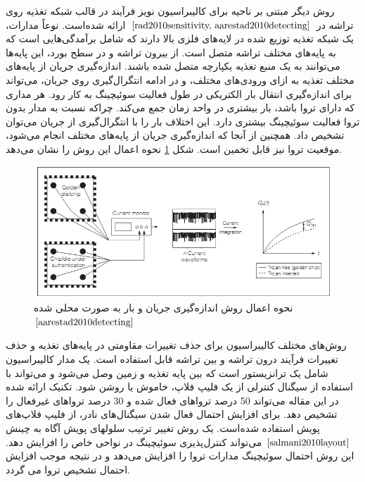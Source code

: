 روش دیگر مبتنی بر ناحیه برای کالیبراسیون نویز فرآیند در قالب شبکه تغذیه روی تراشه در 
$\cite{rad2010sensitivity, aarestad2010detecting}$
ارائه شده‌است. نوعاً مدارات، یک شبکه تغذیه توزیع شده در لایه‌های فلزی بالا دارند که شامل برآمدگی‌هایی است که به پایه‌های مختلف تراشه متصل است. از بیرون تراشه و در سطح بورد، این پایه‌ها می‌توانند به یک منبع تغذیه یکپارچه متصل شده باشند. اندازه‌گیری جریان از پایه‌های مختلف تغذیه به ازای ورودی‌های مختلف، و در ادامه انتگرال‌گیری روی جریان، می‌تواند برای اندازه‌گیری انتقال بار الکتریکی در طول فعالیت سوئیچینگ به کار رود. هر مداری که دارای تروا باشد، بار بیشتری در واحد زمان جمع می‌کند. چراکه نسبت به مدار بدون تروا فعالیت سوئیچینگ بیشتری دارد. این اختلاف بار را با انتگرال‌گیری از جریان می‌توان تشخیص داد. همچنین از آنجا که اندازه‌گیری جریان از پایه‌های مختلف انجام می‌شود، موقعیت تروا نیز قابل تخمین است. شکل \ref{fig5-4} نحوه اعمال این روش را نشان می‌دهد.
\begin{figure}
	\begin{center}
		\includegraphics[scale=0.8]{figs/fig5-4.png}
		\caption[نحوه اعمال روش اندازه‌گیری جریان و بار به صورت محلی شده]
		{نحوه اعمال روش اندازه‌گیری جریان و بار به صورت محلی شده $\cite{aarestad2010detecting}$}
		\label{fig5-4}
	\end{center}
\end{figure} 
روش‌های مختلف کالیبراسیون برای حذف تغییرات مقاومتی در پایه‌های تغذیه و حذف تغییرات فرآیند درون تراشه و بین تراشه قابل استفاده است. یک مدار کالیبراسیون شامل یک ترانزیستور است که بین پایه تغذیه و زمین وصل می‌شود و می‌تواند با استفاده از سیگنال کنترلی از یک فلیپ فلاپ، خاموش یا روشن شود. تکنیک ارائه شده در این مقاله می‌تواند 50 درصد تروا‌های فعال شده و 30 درصد تروا‌های غیرفعال را تشخیص دهد. برای افزایش احتمال فعال شدن سیگنال‌های نادر، از فلیپ فلاپ‌های پویش استفاده شده‌است.
یک روش تغییر ترتیب سلولهای پویش آگاه به چینش $\cite{salmani2010layout}$ می‌تواند کنترل‌پذیری سوئیچینگ در نواحی خاص را افزایش دهد. این روش احتمال سوئیچینگ مدارات تروا را افزایش می‌دهد و در نتیجه موجب افزایش احتمال تشخیص تروا می گردد.
